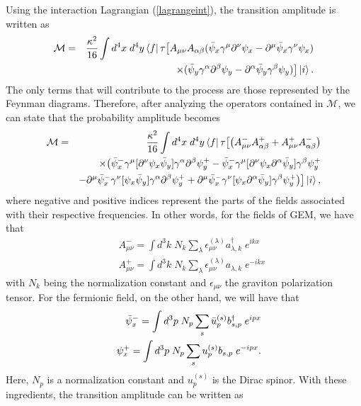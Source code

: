 \documentclass[11pt,showpacs,preprintnumbers,amsmath,amssymb,prd,nofootinbib,superscriptaddress]{revtex4-2}
\begin{document}
Using the interaction Lagrangian (\ref{lagrangeint}), the transition amplitude is written as
\begin{eqnarray}
    \mathcal{M}&=&\frac{\kappa^2}{16}\int d^4x\;d^4y\bra{f}\tau\big[A_{\mu\nu}A_{\alpha\beta}(\Bar{\psi}_x\gamma^{\mu}\partial^{\nu}\psi_x-\partial^{\mu}\Bar{\psi}_x\gamma^\nu \psi_x)\nonumber\\
    &&\times(\Bar{\psi}_y\gamma^{\alpha}\partial^{\beta}\psi_y-\partial^{\alpha}\Bar{\psi}_y\gamma^\beta \psi_y)\big]\ket{i}.
\end{eqnarray}
The only terms that will contribute to the process are those represented by the Feynman diagrams. Therefore, after analyzing the operators contained in $\mathcal{M}$, we can state that the probability amplitude becomes
\begin{eqnarray}
    \mathcal{M}&=&\frac{\kappa^2}{16}\int d^4x\;d^4y\bra{f}\tau\big[\big(A_{\mu\nu}^-A_{\alpha\beta}^+ +A_{\mu\nu}^+A_{\alpha\beta}^-\big)\nonumber\\
    &&\times\big(\Bar{\psi}^-_x\gamma^{\mu}[\partial^\nu\psi_x\Bar{\psi}_y]\gamma^{\alpha}\partial^{\beta}\psi^+_y-\Bar{\psi}^-_x\gamma^\mu[\partial^\nu\psi_x\partial^\alpha\Bar{\psi}_y]\gamma^\beta\psi_y^+\nonumber\\
    &&-\partial^\mu\Bar{\psi}^-_x\gamma^\nu[\psi_x\Bar{\psi}_y]\gamma^\alpha\partial^\beta\psi^+_y+\partial^\mu\Bar{\psi}^-_x\gamma^\nu[\psi_x\partial^\alpha\Bar{\psi}_y]\gamma^\beta\psi_y^+\big)\big]\ket{i},
\end{eqnarray}
where negative and positive indices represent the parts of the fields associated with their respective frequencies. In other words, for the fields of GEM, we have that
\begin{eqnarray}
    &&A_{\mu\nu}^-=\int d^3k\;N_k\sum_\lambda\epsilon_{\mu\nu}^{(\lambda)}a^\dagger_{\lambda,k}\;e^{ikx}\nonumber\\
    &&A_{\mu\nu}^+=\int d^3k\;N_k\sum_\lambda\epsilon_{\mu\nu}^{(\lambda)}a_{\lambda,k}\;e^{-ikx}\label{AGEM}
\end{eqnarray}
with $N_k$ being the normalization constant and $\epsilon_{\mu\nu}$ the graviton polarization tensor. For the fermionic field, on the other hand, we will have that
\begin{eqnarray}
    &&\Bar{\psi}_x^-=\int d^3p\;N_p \sum_s\Bar{u}^{(s)}_p b_{s,p}^\dagger\;e^{
ipx}\nonumber\\
&&\psi_x^+=\int d^3p\;N_p \sum_s u^{(s)}_p b_{s,p}\;e^{-ipx}.\label{FERMIDIRAC}
\end{eqnarray}
Here, $N_p$ is a normalization constant and $u^{(s)}_p$ is the Dirac spinor. With these ingredients, the transition amplitude can be written as
\end{document}
